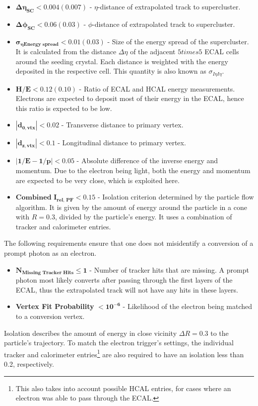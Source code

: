 \begin{itemize}
\item $\mathbf{\Delta \eta_{\textbf{SC}} < 0.004 (0.007)}$ - $\eta$-distance of extrapolated track to supercluster.
\item $\mathbf{\Delta \phi_{\textbf{SC}} < 0.06 (0.03)}$ - $\phi$-distance of extrapolated track to supercluster.
\item $\mathbf{\sigma_{\eta \text{Energy spread}} < 0.01 (0.03)}$ - Size of the energy spread of the supercluster. It is calculated from the distance $\Delta \eta$ of the adjacent $5 times 5$ ECAL cells around the seeding crystal. Each distance is weighted with the energy deposited in the respective cell. This quantity is also known as $\sigma_{I \eta I \eta}$.
\item $\mathbf{H / E < 0.12 (0.10)}$ - Ratio of ECAL and HCAL energy measurements. Electrons are expected to deposit most of their energy in the ECAL, hence this ratio is expected to be low. 
\item $\mathbf{|d_{0, \textbf{vtx}}| < 0.02}$ - Transverse distance to primary vertex.
\item $\mathbf{|d_{z, \textbf{vtx}}| < 0.1}$ - Longitudinal distance to primary vertex.
\item $\mathbf{|1/E - 1/p| < 0.05}$ - Absolute difference of the inverse energy and momentum. Due to the electron being light, both the energy and momentum are expected to be very close, which is exploited here.  
\item $\mathbf{\textbf{Combined I}_{\textbf{rel, PF}} < 0.15}$ - Isolation criterion determined by the particle flow algorithm. It is given by the amount of energy around the particle in a cone with $R = 0.3$, divided by the particle's energy. It uses a combination of tracker and calorimeter entries.
\end{itemize}
\noindent The following requirements ensure that one does not misidentify a conversion of a prompt photon as an electron. 
\begin{itemize}
\item $\mathbf{N_{\text{Missing Tracker Hits}} \leq 1}$ - Number of tracker hits that are missing. A prompt photon most likely converts after passing through the first layers of the ECAL, thus the extrapolated track will not have any hits in these layers. 
\item \textbf{Vertex Fit Probability} $\mathbf{< 10^{-6}}$ - Likelihood of the electron being matched to a conversion vertex.
\end{itemize}

Isolation describes the amount of energy in close vicinity $\Delta R = 0.3$ to the particle's trajectory. To match the electron trigger's settings, the individual tracker and calorimeter entries\footnote{This also takes into account possible HCAL entries, for cases where an electron was able to pass through the ECAL.} are also required to have an isolation less than 0.2, respectively.

